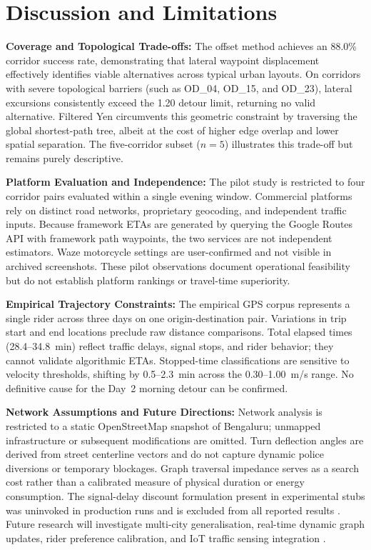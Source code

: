 \documentclass[11pt,conference]{IEEEtran}
\begin{document}

\section{Discussion and Limitations}

\noindent\textbf{Coverage and Topological Trade-offs:}
The offset method achieves an 88.0\% corridor success rate, demonstrating that lateral waypoint displacement effectively identifies viable alternatives across typical urban layouts.
On corridors with severe topological barriers (such as OD\_04, OD\_15, and OD\_23), lateral excursions consistently exceed the 1.20 detour limit, returning no valid alternative.
Filtered Yen circumvents this geometric constraint by traversing the global shortest-path tree, albeit at the cost of higher edge overlap and lower spatial separation.
The five-corridor subset ($n=5$) illustrates this trade-off but remains purely descriptive.

\noindent\textbf{Platform Evaluation and Independence:}
The pilot study is restricted to four corridor pairs evaluated within a single evening window.
Commercial platforms rely on distinct road networks, proprietary geocoding, and independent traffic inputs.
Because framework ETAs are generated by querying the Google Routes API with framework path waypoints, the two services are not independent estimators.
Waze motorcycle settings are user-confirmed and not visible in archived screenshots.
These pilot observations document operational feasibility but do not establish platform rankings or travel-time superiority.

\noindent\textbf{Empirical Trajectory Constraints:}
The empirical GPS corpus represents a single rider across three days on one origin-destination pair.
Variations in trip start and end locations preclude raw distance comparisons.
Total elapsed times (28.4--34.8~min) reflect traffic delays, signal stops, and rider behavior; they cannot validate algorithmic ETAs.
Stopped-time classifications are sensitive to velocity thresholds, shifting by 0.5--2.3~min across the 0.30--1.00~m/s range.
No definitive cause for the Day~2 morning detour can be confirmed.

\noindent\textbf{Network Assumptions and Future Directions:}
Network analysis is restricted to a static OpenStreetMap snapshot of Bengaluru; unmapped infrastructure or subsequent modifications are omitted.
Turn deflection angles are derived from street centerline vectors and do not capture dynamic police diversions or temporary blockages.
Graph traversal impedance serves as a search cost rather than a calibrated measure of physical duration or energy consumption.
The signal-delay discount formulation present in experimental stubs was uninvoked in production runs and is excluded from all reported results \cite{promraksa2022lane,abbas2019internet}.
Future research will investigate multi-city generalisation, real-time dynamic graph updates, rider preference calibration, and IoT traffic sensing integration \cite{abbas2019internet}.
\end{document}
